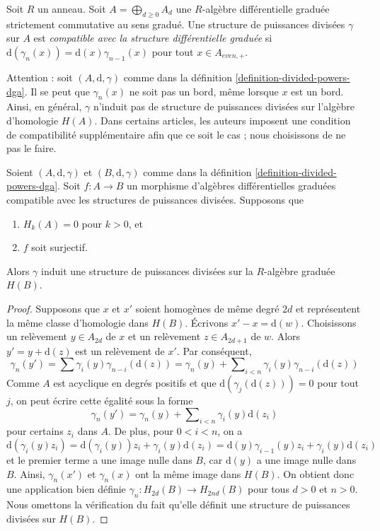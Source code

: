 \begin{definition}
\label{definition-divided-powers-dga}
Soit $R$ un anneau. Soit $A = \bigoplus_{d \geq 0} A_d$ une $R$-algèbre
différentielle graduée strictement commutative au sens gradué. Une structure
de puissances divisées $\gamma$ sur $A$ est {\it compatible avec la structure
différentielle graduée} si
$\text{d}(\gamma_n(x)) = \text{d}(x) \gamma_{n - 1}(x)$ pour tout
$x \in A_{even, +}$.
\end{definition}

\noindent
Attention : soit $(A, \text{d}, \gamma)$ comme dans la définition
\ref{definition-divided-powers-dga}. Il se peut que $\gamma_n(x)$ ne soit pas
un bord, même lorsque $x$ est un bord. Ainsi, en général, $\gamma$
n'induit pas de structure de puissances divisées sur l'algèbre d'homologie
$H(A)$. Dans certains articles, les auteurs imposent une condition de
compatibilité supplémentaire afin que ce soit le cas ; nous choisissons de
ne pas le faire.

\begin{lemma}
\label{lemma-dpdga-good}
Soient $(A, \text{d}, \gamma)$ et $(B, \text{d}, \gamma)$ comme dans la
définition \ref{definition-divided-powers-dga}. Soit $f : A \to B$ un
morphisme d'algèbres différentielles graduées compatible avec les structures
de puissances divisées. Supposons que
\begin{enumerate}
\item $H_k(A) = 0$ pour $k > 0$, et
\item $f$ soit surjectif.
\end{enumerate}
Alors $\gamma$ induit une structure de puissances divisées sur la
$R$-algèbre graduée $H(B)$.
\end{lemma}

\begin{proof}
Supposons que $x$ et $x'$ soient homogènes de même degré $2d$ et représentent
la même classe d'homologie dans $H(B)$. Écrivons
$x' - x = \text{d}(w)$. Choisissons un relèvement $y \in A_{2d}$ de $x$ et
un relèvement $z \in A_{2d + 1}$ de $w$. Alors
$y' = y + \text{d}(z)$ est un relèvement de $x'$. Par conséquent,
$$
\gamma_n(y') = \sum \gamma_i(y) \gamma_{n - i}(\text{d}(z))
= \gamma_n(y) +
\sum\nolimits_{i < n} \gamma_i(y) \gamma_{n - i}(\text{d}(z))
$$
Comme $A$ est acyclique en degrés positifs et que
$\text{d}(\gamma_j(\text{d}(z))) = 0$ pour tout $j$, on peut écrire cette
égalité sous la forme
$$
\gamma_n(y') = \gamma_n(y) +
\sum\nolimits_{i < n} \gamma_i(y) \text{d}(z_i)
$$
pour certains $z_i$ dans $A$. De plus, pour $0 < i < n$, on a
$$
\text{d}(\gamma_i(y) z_i) =
\text{d}(\gamma_i(y))z_i + \gamma_i(y)\text{d}(z_i) =
\text{d}(y) \gamma_{i - 1}(y) z_i + \gamma_i(y)\text{d}(z_i)
$$
et le premier terme a une image nulle dans $B$, car $\text{d}(y)$ a une
image nulle dans $B$. Ainsi, $\gamma_n(x')$ et $\gamma_n(x)$ ont la même
image dans $H(B)$. On obtient donc une application bien définie
$\gamma_n : H_{2d}(B) \to H_{2nd}(B)$ pour tous $d > 0$ et $n > 0$.
Nous omettons la vérification du fait qu'elle définit une structure de
puissances divisées sur $H(B)$.
\end{proof}

